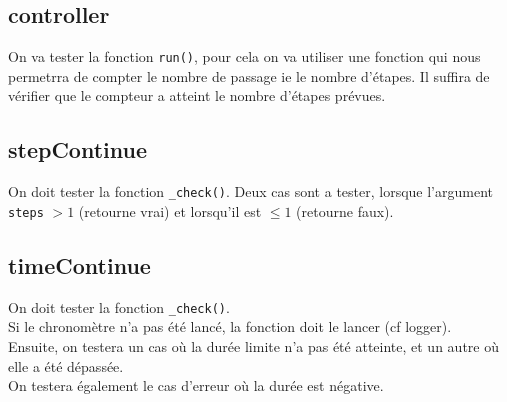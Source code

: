 

\subsection{controller}

On va tester la fonction \texttt{run()}, pour cela on va utiliser une fonction qui nous permetrra de compter le nombre de passage ie le nombre d'étapes. Il suffira de vérifier que le compteur a atteint le nombre d'étapes prévues.




\subsection{stepContinue}

On doit tester la fonction \texttt{\_check()}. Deux cas sont a tester, lorsque l'argument \texttt{steps} $>1$ (retourne vrai) et lorsqu'il est $\leq1$ (retourne faux).\\

\subsection{timeContinue}


On doit tester la fonction \texttt{\_check()}.\\
Si le chronomètre n'a pas été lancé, la fonction doit le lancer (cf logger).\\
Ensuite, on testera un cas où la durée limite n'a pas été atteinte, et un autre où elle a été dépassée.\\
On testera également le cas d'erreur où la durée est négative.
